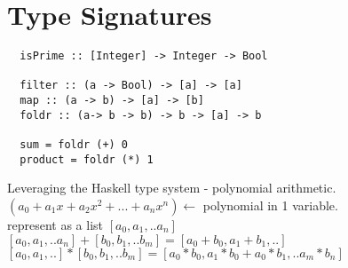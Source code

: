 \documentclass{article}
\begin{document}
\section*{Type Signatures}
\begin{flushleft}
 \begin{verbatim}
  isPrime :: [Integer] -> Integer -> Bool
  
  filter :: (a -> Bool) -> [a] -> [a]
  map :: (a -> b) -> [a] -> [b]
  foldr :: (a-> b -> b) -> b -> [a] -> b
  
  sum = foldr (+) 0
  product = foldr (*) 1
 \end{verbatim}
 Leveraging the Haskell type system - polynomial arithmetic.\\
 $(a_0 + a_1x + a_2x^2 + ... + a_nx^n) \leftarrow$ polynomial in 1 variable.\\
 represent as a list $[a_0, a_1, .. a_n]$\\
 $[a_0, a_1, .. a_n] + [b_0, b_1, .. b_m] = [a_0 + b_0, a_1 + b_1, ..]$\\
 $[a_0, a_1, ..] * [b_0, b_1, .. b_m] = [a_0 * b_0, a_1 * b_0 + a_0 * b_1, .. a_m * b_n]$
\end{flushleft} 
\end{document}
